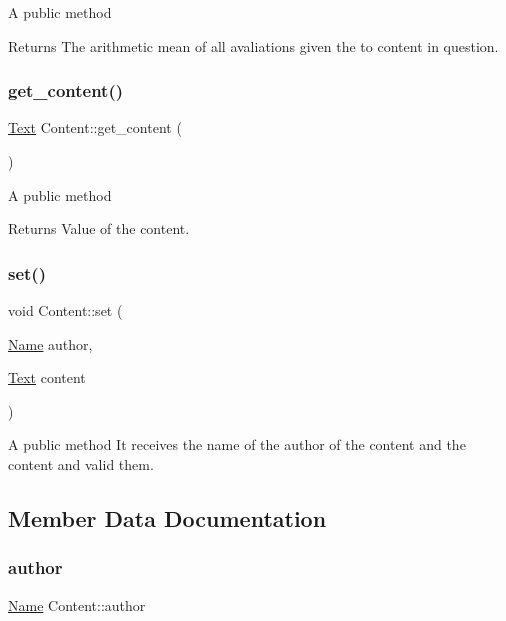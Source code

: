 A public method \begin{DoxyReturn}{Returns}
The arithmetic mean of all avaliations given the to content in question. 
\end{DoxyReturn}
\mbox{\label{class_content_a855ce935e96e9c811ef84e0b20c38a59}} 
\subsubsection{\texorpdfstring{get\+\_\+content()}{get\_content()}}
{\footnotesize\ttfamily \hyperlink{class_text}{Text} Content\+::get\+\_\+content (\begin{DoxyParamCaption}{ }\end{DoxyParamCaption})}

A public method \begin{DoxyReturn}{Returns}
Value of the content. 
\end{DoxyReturn}
\mbox{\label{class_content_a97a7150f5500238ca0de6f73073d8e71}} 
\subsubsection{\texorpdfstring{set()}{set()}}
{\footnotesize\ttfamily void Content\+::set (\begin{DoxyParamCaption}\item[{\hyperlink{class_name}{Name}}]{author,  }\item[{\hyperlink{class_text}{Text}}]{content }\end{DoxyParamCaption})}

A public method It receives the name of the author of the content and the content and valid them. 

\subsection{Member Data Documentation}
\mbox{\label{class_content_a2b57299937210d9374f79624d44a4f33}} 
\subsubsection{\texorpdfstring{author}{author}}
{\footnotesize\ttfamily \hyperlink{class_name}{Name} Content\+::author\hspace{0.3cm}{\ttfamily [protected]}}

